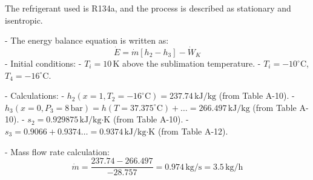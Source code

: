 The refrigerant used is R134a, and the process is described as stationary and isentropic.  

- The energy balance equation is written as:  
  \[
  \dot{E} = \dot{m} \left[ h_2 - h_3 \right] - \dot{W}_K
  \]  
- Initial conditions:  
  - \( T_i = 10 \, \text{K} \) above the sublimation temperature.  
  - \( T_i = -10^\circ\text{C} \), \( T_4 = -16^\circ\text{C} \).  

- Calculations:  
  - \( h_2 (x=1, T_2=-16^\circ\text{C}) = 237.74 \, \text{kJ/kg} \) (from Table A-10).  
  - \( h_3 (x=0, P_3=8 \, \text{bar}) = h(T=37.375^\circ\text{C}) + \dots = 266.497 \, \text{kJ/kg} \) (from Table A-10).  
  - \( s_2 = 0.929875 \, \text{kJ/kg·K} \) (from Table A-10).  
  - \( s_3 = 0.9066 + 0.9374 \dots = 0.9374 \, \text{kJ/kg·K} \) (from Table A-12).  

- Mass flow rate calculation:  
  \[
  \dot{m} = \frac{237.74 - 266.497}{-28.757} = 0.974 \, \text{kg/s} = 3.5 \, \text{kg/h}
  \]